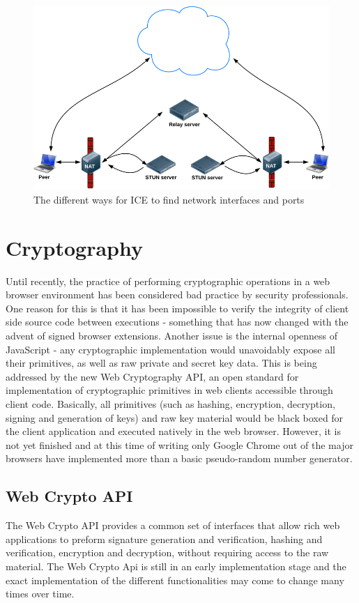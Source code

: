 \begin{figure}[htp]
\centering
\includegraphics[width=\textwidth,height=0.25\paperheight,keepaspectratio
]{figures/ICE}
\caption{The different ways for ICE to find network interfaces and ports \cite{WebRTCBasics:2012:Online}}
\label{fig:ICE}
\end{figure}

\section{Cryptography}
Until recently, the practice of performing cryptographic operations in a web browser environment has been considered bad practice by security professionals\cite{Matasano:Online}. One reason for this is that it has been impossible to verify the integrity of client side source code between executions - something that has now changed with the advent of signed browser extensions. Another issue is the internal openness of JavaScript - any cryptographic implementation would unavoidably expose all their primitives, as well as raw private and secret key data. This is being addressed by the new Web Cryptography API\cite{WebCrypto:Online}, an open standard for implementation of cryptographic primitives in web clients accessible through client code. Basically, all primitives (such as hashing, encryption, decryption, signing and generation of keys) and raw key material would be black boxed for the client application and executed natively in the web browser. However, it is not yet finished and at this time of writing only Google Chrome out of the major browsers have implemented more than a basic pseudo-random number generator.

\subsection{Web Crypto API}
The Web Crypto API provides a common set of interfaces that allow rich web applications to preform signature generation and verification, hashing and verification, encryption and decryption, without requiring access to the raw material. The Web Crypto Api is still in an early implementation stage and the exact implementation of the different functionalities may come to change many times over time.

